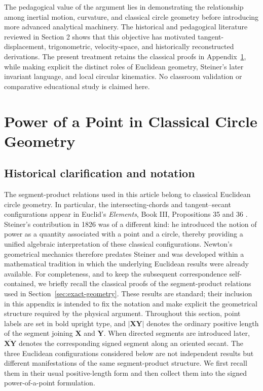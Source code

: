 \documentclass[preprint,12pt,3p,nopreprintline]{elsarticle}
\newcommand{\pt}[1]{\mathbf{#1}}
\newcommand{\seglen}[1]{\lvert\mathbf{#1}\rvert}
\newcommand{\dseg}[1]{\overline{\mathbf{#1}}}
\numberwithin{equation}{section}
\theoremstyle{remark}
\begin{document}
The pedagogical value of the argument lies in demonstrating the relationship among inertial motion, curvature, and classical circle geometry before introducing more advanced analytical machinery. The historical and pedagogical literature reviewed in Section 2 shows that this objective has motivated tangent-displacement, trigonometric, velocity-space, and historically reconstructed derivations. The present treatment retains the classical proofs in Appendix~\ref{app:power-point}, while making explicit the distinct roles of Euclidean geometry, Steiner's later invariant language, and local circular kinematics. No classroom validation or comparative educational study is claimed here.






\clearpage
\appendix
\setcounter{subsection}{0}
\renewcommand{\thesubsection}{A.\arabic{subsection}}
\setcounter{figure}{0}
\renewcommand{\thefigure}{A.\arabic{figure}}
\renewcommand{\theproposition}{A.\arabic{proposition}}
\section{Power of a Point in Classical Circle Geometry}\label{app:power-point}

\subsection{Historical clarification and notation}

The segment-product relations used in this article belong to classical Euclidean circle geometry. In particular, the intersecting-chords and tangent--secant configurations appear in Euclid's \textit{Elements}, Book III, Propositions 35 and 36 \cite{euclid1956elements}. Steiner's contribution in 1826 \cite{steiner1826einige} was of a different kind: he introduced the notion of power as a quantity associated with a point and a circle, thereby providing a unified algebraic interpretation of these classical configurations. Newton's geometrical mechanics therefore predates Steiner and was developed within a mathematical tradition in which the underlying Euclidean results were already available. For completeness, and to keep the subsequent correspondence self-contained, we briefly recall the classical proofs of the segment-product relations used in Section~\ref{sec:exact-geometry}. These results are standard; their inclusion in this appendix is intended to fix the notation and make explicit the geometrical structure required by the physical argument. Throughout this section, point labels are set in bold upright type, and $\seglen{XY}$ denotes the ordinary positive length of the segment joining $\pt{X}$ and $\pt{Y}$. When directed segments are introduced later, $\dseg{XY}$ denotes the corresponding signed segment along an oriented secant. The three Euclidean configurations considered below are not independent results but different manifestations of the same segment-product structure. We first recall them in their usual positive-length form and then collect them into the signed power-of-a-point formulation.
\end{document}

